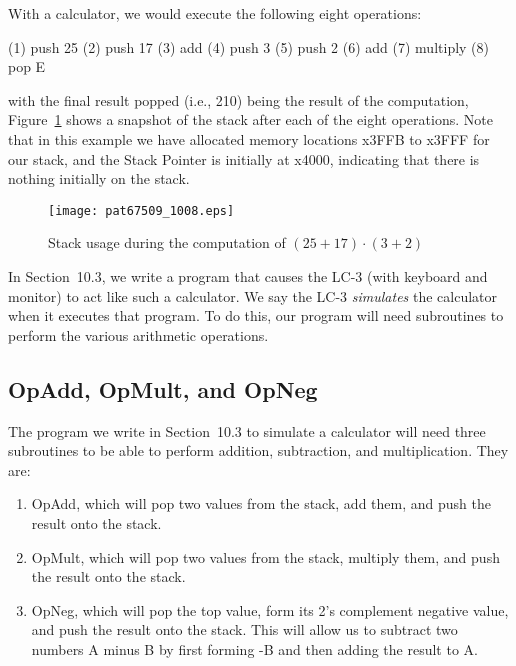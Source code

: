 \documentclass{patt}
\begin{document}
With a calculator, we would execute the following
eight operations:

\begin{colorverbatim}
                      (1)    push     25
                      (2)    push     17
                      (3)    add
                      (4)    push     3
                      (5)    push     2
                      (6)    add
                      (7)    multiply
                      (8)    pop      E
\end{colorverbatim}

\noindent
with the final result popped (i.e., 210) being the result of the computation, 
Figure~\ref{fig:25+17*3+2} shows a snapshot of the stack after each of the
eight operations.  Note that in this example we have allocated memory locations
x3FFB to x3FFF for our stack, and the Stack Pointer is initially at x4000,
indicating that there is nothing initially on the stack.

\begin{figure}[h]
\centerline{\texttt{[image: pat67509\_1008.eps]}}
\caption{Stack usage during the computation
of $(25+17)\cdot (3+2)$}
\label{fig:25+17*3+2}
\end{figure}

\FloatBarrier
In Section~10.3, we write a program that causes the LC-3 (with keyboard and 
monitor) to act like such a calculator. We say the LC-3 {\em simulates} the 
calculator when it executes that program.  To do this, our program will need
subroutines to perform the various arithmetic operations.

\subsection{OpAdd, OpMult, and OpNeg}

The program we write in Section~10.3 to simulate a calculator will need 
three subroutines to be able to perform addition, subtraction, and 
multiplication.  They are:

\begin{enumerate}
\item %
  OpAdd, which will pop two values from the stack, add them, and push
  the result onto the stack.

\item %
OpMult, which will pop two values from the stack, multiply them,
and push the result onto the stack.

\item %
  OpNeg, which will pop the top value, form its 2's complement
  negative value, and push the result onto the stack.  This will allow us
to subtract two numbers A minus B by first forming -B and then adding the
result to A.
\end{enumerate}
\end{document}
